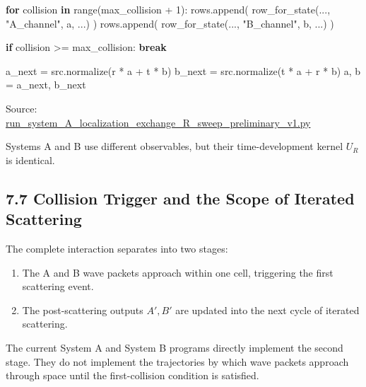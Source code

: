 \documentclass[
  10pt,
  a4paper,
]{article}
\newenvironment{Shaded}{}{}
\newcommand{\BuiltInTok}[1]{\textcolor[rgb]{0.00,0.50,0.00}{#1}}
\newcommand{\ControlFlowTok}[1]{\textcolor[rgb]{0.00,0.44,0.13}{\textbf{#1}}}
\newcommand{\DecValTok}[1]{\textcolor[rgb]{0.25,0.63,0.44}{#1}}
\newcommand{\KeywordTok}[1]{\textcolor[rgb]{0.00,0.44,0.13}{\textbf{#1}}}
\newcommand{\NormalTok}[1]{#1}
\newcommand{\OperatorTok}[1]{\textcolor[rgb]{0.40,0.40,0.40}{#1}}
\newcommand{\StringTok}[1]{\textcolor[rgb]{0.25,0.44,0.63}{#1}}
\providecommand{\tightlist}{%
  \setlength{\itemsep}{0pt}\setlength{\parskip}{0pt}}
\begin{document}
\begin{Shaded}
\begin{Highlighting}[]
\ControlFlowTok{for}\NormalTok{ collision }\KeywordTok{in} \BuiltInTok{range}\NormalTok{(max\_collision }\OperatorTok{+} \DecValTok{1}\NormalTok{):}
\NormalTok{    rows.append(}
\NormalTok{        row\_for\_state(..., }\StringTok{"A\_channel"}\NormalTok{, a, ...)}
\NormalTok{    )}
\NormalTok{    rows.append(}
\NormalTok{        row\_for\_state(..., }\StringTok{"B\_channel"}\NormalTok{, b, ...)}
\NormalTok{    )}

    \ControlFlowTok{if}\NormalTok{ collision }\OperatorTok{\textgreater{}=}\NormalTok{ max\_collision:}
        \ControlFlowTok{break}

\NormalTok{    a\_next }\OperatorTok{=}\NormalTok{ src.normalize(r }\OperatorTok{*}\NormalTok{ a }\OperatorTok{+}\NormalTok{ t }\OperatorTok{*}\NormalTok{ b)}
\NormalTok{    b\_next }\OperatorTok{=}\NormalTok{ src.normalize(t }\OperatorTok{*}\NormalTok{ a }\OperatorTok{+}\NormalTok{ r }\OperatorTok{*}\NormalTok{ b)}
\NormalTok{    a, b }\OperatorTok{=}\NormalTok{ a\_next, b\_next}
\end{Highlighting}
\end{Shaded}

Source:\\
\href{../20260715/run_system_A_localization_exchange_R_sweep_preliminary_v1.py\#L718-L737}{run\_system\_A\_localization\_exchange\_R\_sweep\_preliminary\_v1.py}

Systems A and B use different observables, but their time-development
kernel \(U_R\) is identical.

\subsection{7.7 Collision Trigger and the Scope of Iterated
Scattering}\label{collision-trigger-and-the-scope-of-iterated-scattering}

The complete interaction separates into two stages:

\begin{enumerate}
\def\labelenumi{\arabic{enumi}.}
\tightlist
\item
  The A and B wave packets approach within one cell, triggering the
  first scattering event.
\item
  The post-scattering outputs \(A',B'\) are updated into the next cycle
  of iterated scattering.
\end{enumerate}

The current System A and System B programs directly implement the second
stage. They do not implement the trajectories by which wave packets
approach through space until the first-collision condition is satisfied.
\end{document}
